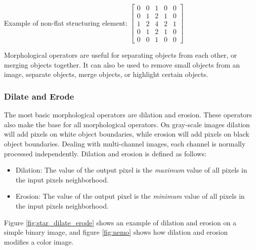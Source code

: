 \noindent Example of non-flat structuring element:
$\begin{bmatrix}
    0 & 0 & 1 & 0 & 0 \\
    0 & 1 & 2 & 1 & 0 \\
    1 & 2 & 4 & 2 & 1 \\
    0 & 1 & 2 & 1 & 0 \\
    0 & 0 & 1 & 0 & 0
\end{bmatrix}$ 

Morphological operators are useful for separating objects from each other, or merging objects together. It can also be used to remove small objects from an image, separate objects, merge objects, or highlight certain objects.


\subsubsection{Dilate and Erode}
The most basic morphological operators are dilation and erosion. These operators also make the base for all morphological operators. On gray-scale images dilation will add pixels on white object boundaries, while erosion will add pixels on black object boundaries. Dealing with multi-channel images, each channel is normally processed independently. Dilation and erosion is defined as follows:
\begin{itemize}
    \item Dilation: The value of the output pixel is the \textit{maximum} value of all pixels in the input pixels neighborhood.\cite{website:mathworks_morphology} 
    \item Erosion: The value of the output pixel is the \textit{minimum} value of all pixels in the input pixels neighborhood.\cite{website:mathworks_morphology}
\end{itemize}

Figure \ref{fig:star_dilate_erode} shows an example of dilation and erosion on a simple binary image, and figure \ref{fig:nemo} shows how dilation and erosion modifies a color image.

